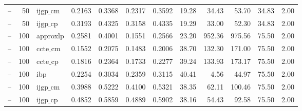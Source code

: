 \begin{table}[ht]
\begin{tabular}{lrlrrrrrrrrr}
-- & 50 & $\text{ijgp\_cm}$ & 0.2163 & 0.3368 & 0.2317 & 0.3592 & 19.28 & 34.43 & 53.70 & 34.83 & 2.00 \\
-- & 50 & $\text{ijgp\_cp}$ & 0.3193 & 0.4325 & 0.3158 & 0.4335 & 19.29 & 33.00 & 52.30 & 34.83 & 2.00 \\
-- & 100 & approxlp & 0.2581 & 0.4001 & 0.1551 & 0.2566 & 23.20 & 952.36 & 975.56 & 75.50 & 2.00 \\
-- & 100 & $\text{ccte\_cm}$ & 0.1552 & 0.2075 & 0.1483 & 0.2006 & 38.70 & 132.30 & 171.00 & 75.50 & 2.00 \\
-- & 100 & $\text{ccte\_cp}$ & 0.1816 & 0.2364 & 0.1733 & 0.2277 & 39.24 & 133.93 & 173.17 & 75.50 & 2.00 \\
-- & 100 & ibp & 0.2254 & 0.3034 & 0.2359 & 0.3115 & 40.41 & 4.56 & 44.97 & 75.50 & 2.00 \\
-- & 100 & $\text{ijgp\_cm}$ & 0.3988 & 0.5222 & 0.4100 & 0.5321 & 38.35 & 62.11 & 100.46 & 75.50 & 2.00 \\
-- & 100 & $\text{ijgp\_cp}$ & 0.4852 & 0.5859 & 0.4889 & 0.5902 & 38.16 & 54.43 & 92.58 & 75.50 & 2.00 \\
\bottomrule
\end{tabular}
\end{table}
